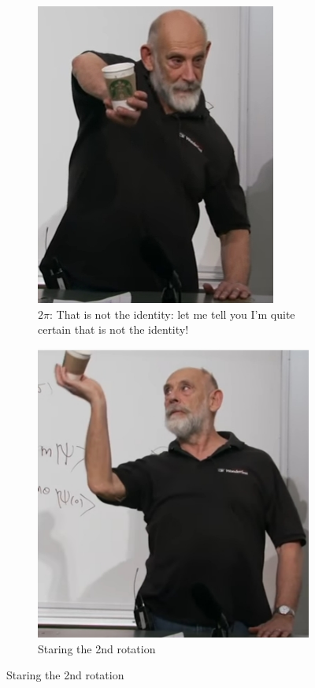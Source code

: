 \documentclass[]{article}
\begin{document}
\begin{figure}[H]
\begin{subfigure}{0.45\textwidth}
		\caption{$2\pi$: That is not the identity: let me tell you I'm quite certain that is not the identity!}
		\includegraphics[width=\textwidth]{aqm-5-coffee-cup2}
	\end{subfigure}
	\begin{subfigure}{0.45\textwidth}
		\caption{Staring the 2nd rotation}
		\includegraphics[width=\textwidth]{aqm-5-coffee-cup3}

\end{subfigure}
\end{figure}
\end{document}
